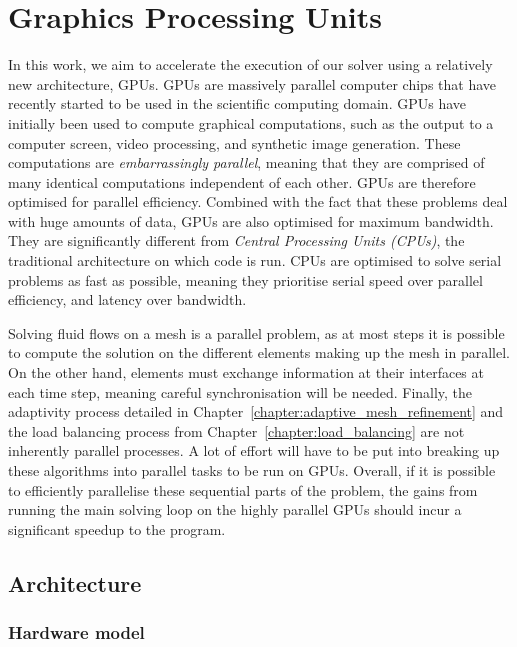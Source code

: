 \chapter{Graphics Processing Units} \label{chapter:graphics_processing_units}

In this work, we aim to accelerate the execution of our solver using a relatively new architecture,
GPUs. GPUs are massively parallel computer chips that have recently started to be used in the
scientific computing domain. GPUs have initially been used to compute graphical computations, such
as the output to a computer screen, video processing, and synthetic image generation. These
computations are \textit{embarrassingly parallel}, meaning that they are comprised of many identical
computations independent of each other. GPUs are therefore optimised for parallel efficiency.
Combined with the fact that these problems deal with huge amounts of data, GPUs are also optimised
for maximum bandwidth. They are significantly different from \textit{Central Processing Units
(CPUs)}, the traditional architecture on which code is run. CPUs are optimised to solve serial
problems as fast as possible, meaning they prioritise serial speed over parallel efficiency, and
latency over bandwidth. 

Solving fluid flows on a mesh is a parallel problem, as at most steps it is possible to compute
the solution on the different elements making up the mesh in parallel. On the other hand, elements
must exchange information at their interfaces at each time step, meaning careful synchronisation
will be needed. Finally, the adaptivity process detailed in
Chapter~\ref{chapter:adaptive_mesh_refinement} and the load balancing process from
Chapter~\ref{chapter:load_balancing} are not inherently parallel processes. A lot of effort will
have to be put into breaking up these algorithms into parallel tasks to be run on GPUs. Overall, if
it is possible to efficiently parallelise these sequential parts of the problem, the gains from
running the main solving loop on the highly parallel GPUs should incur a significant speedup to the
program.

\section{Architecture} \label{section:graphics_processing_units:architecture}

\subsection{Hardware model} \label{subsection:graphics_processing_units:architecture:hardware_model}

